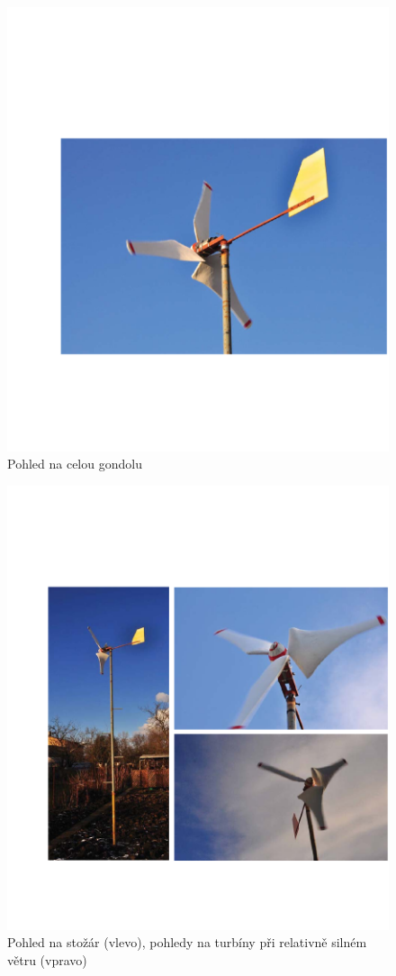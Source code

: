 \begin{figure}[H]
	\centering
	\includegraphics[]{obrazky/foto2}
	\caption{Pohled na celou gondolu}
	\label{foto2}
\end{figure}

\begin{figure}[H]
	\centering
	\includegraphics[]{obrazky/foto3}
	\caption{Pohled na stožár (vlevo), pohledy na turbíny při relativně silném větru (vpravo)}
	\label{foto3}
\end{figure}

